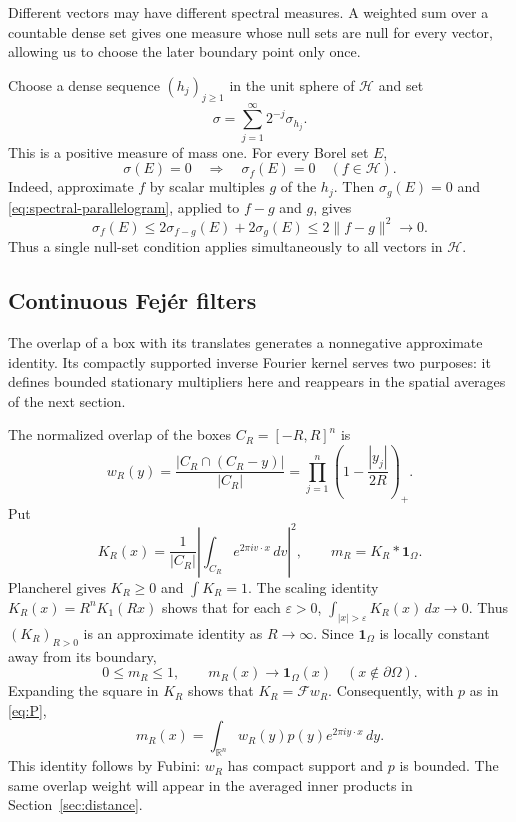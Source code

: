 \documentclass[a4paper,12pt,reqno]{amsart}
\newcommand{\lead}[1]{\par\smallskip\noindent\leavevmode#1\par\smallskip}
\theoremstyle{remark}
\numberwithin{equation}{section}
\newcommand{\R}{\mathbb R}
\newcommand{\Hh}{\mathcal H}
\newcommand{\Ff}{\mathcal F}
\newcommand{\one}{\mathbf 1}
\begin{document}
\lead{Different vectors may have different spectral measures. A weighted
sum over a countable dense set gives one measure whose null sets are null
for every vector, allowing us to choose the later boundary point only
once.}


Choose a dense sequence $(h_j)_{j\geq1}$ in the unit sphere of $\Hh$
and set
\begin{equation}\label{eq:control}
 \sigma=\sum_{j=1}^\infty2^{-j}\sigma_{h_j}.
\end{equation}
This is a positive measure of mass one. For every Borel set $E$,
\begin{equation}\label{eq:control-null}
 \sigma(E)=0\quad\Longrightarrow\quad
 \sigma_f(E)=0\quad(f\in\Hh).
\end{equation}
Indeed, approximate $f$ by scalar multiples $g$ of the $h_j$.
Then $\sigma_g(E)=0$ and \eqref{eq:spectral-parallelogram}, applied to $f-g$ and $g$, gives
\[
 \sigma_f(E)\leq2\sigma_{f-g}(E)+2\sigma_g(E)
 \leq2\|f-g\|^2\longrightarrow0.
\]
Thus a single null-set condition applies simultaneously to all vectors
in $\Hh$.

\subsection{Continuous Fej\'er filters}

\lead{The overlap of a box with its translates generates a nonnegative
approximate identity. Its compactly supported inverse Fourier kernel
serves two purposes: it defines bounded stationary multipliers here and
reappears in the spatial averages of the next section.}


The normalized overlap of the boxes $C_R=[-R,R]^n$ is
\begin{equation}\label{eq:fejer-weights}
 w_R(y)=\frac{|C_R\cap(C_R-y)|}{|C_R|}
 =\prod_{j=1}^n\left(1-\frac{|y_j|}{2R}\right)_+.
\end{equation}
Put
\[
 K_R(x)=\frac{1}{|C_R|}\left|\int_{C_R}e^{2\pi iv\cdot x}\,dv\right|^2,
 \qquad m_R=K_R*\one_\Omega.
\]
Plancherel gives $K_R\geq0$ and $\int K_R=1$. The scaling identity
$K_R(x)=R^nK_1(Rx)$ shows that for each $\varepsilon>0$,
$\int_{|x|>\varepsilon}K_R(x)\,dx\to0$. Thus $(K_R)_{R>0}$ is an approximate
identity as $R\to\infty$. Since $\one_\Omega$ is locally constant away from its boundary,
\begin{equation}\label{eq:fejer-convergence}
 0\leq m_R\leq1,\qquad
 m_R(x)\longrightarrow\one_\Omega(x)\quad(x\notin\partial\Omega).
\end{equation}
Expanding the square in $K_R$ shows that $K_R=\Ff w_R$. Consequently,
with $p$ as in \eqref{eq:P},
\begin{equation}\label{eq:fejer-coefficients}
 m_R(x)=\int_{\R^n}w_R(y)p(y)e^{2\pi iy\cdot x}\,dy.
\end{equation}
This identity follows by Fubini: $w_R$ has compact support and $p$ is
bounded. The same overlap weight will appear in the averaged inner
products in Section~\ref{sec:distance}.
\end{document}
